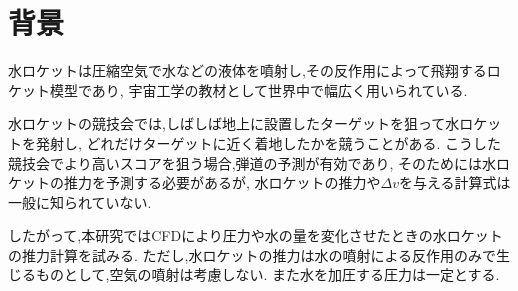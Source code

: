 \section{背景}
水ロケットは圧縮空気で水などの液体を噴射し,その反作用によって飛翔するロケット模型であり,
宇宙工学の教材として世界中で幅広く用いられている.

水ロケットの競技会では,しばしば地上に設置したターゲットを狙って水ロケットを発射し,
どれだけターゲットに近く着地したかを競うことがある.
こうした競技会でより高いスコアを狙う場合,弾道の予測が有効であり,
そのためには水ロケットの推力を予測する必要があるが,
水ロケットの推力や$\Delta{v}$を与える計算式は一般に知られていない.

したがって,本研究ではCFDにより圧力や水の量を変化させたときの水ロケットの推力計算を試みる.
ただし,水ロケットの推力は水の噴射による反作用のみで生じるものとして,空気の噴射は考慮しない.
また水を加圧する圧力は一定とする.